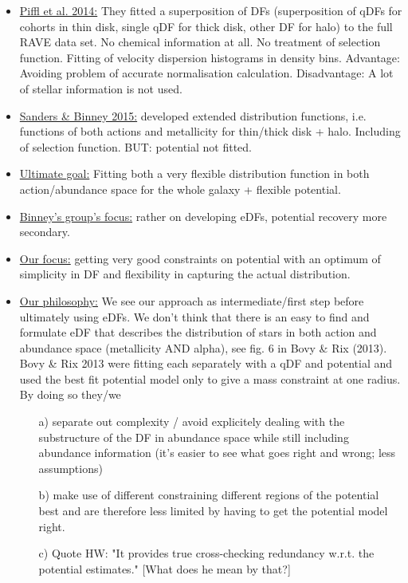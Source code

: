 \begin{itemize}
\begin{itemize}
\item \underline{Piffl et al. 2014:} They fitted a superposition of DFs (superposition of qDFs for cohorts in thin disk, single qDF for thick disk, other DF for halo) to the full RAVE data set. No chemical information at all. No treatment of selection function. Fitting of velocity dispersion histograms in density bins. Advantage: Avoiding problem of accurate normalisation calculation. Disadvantage: A lot of stellar information is not used.
\item  \underline{Sanders \& Binney 2015:} developed extended distribution functions, i.e. functions of both actions and metallicity for thin/thick disk + halo. Including of selection function. BUT: potential not fitted.
\item \underline{Ultimate goal:} Fitting both a very flexible distribution function in both action/abundance space for the whole galaxy + flexible potential.
\item \underline{Binney's group's focus:} rather on developing eDFs, potential recovery more secondary.
\item \underline{Our focus:} getting very good constraints on potential with an optimum of simplicity in DF and flexibility in capturing the actual distribution. 
\item \underline{Our philosophy:} We see our approach as intermediate/first step before ultimately using eDFs. We don't think that there is an easy to find and formulate eDF that describes the distribution of stars in both action and abundance space (metallicity AND alpha), see fig. 6 in Bovy \& Rix (2013). Bovy \& Rix 2013 were fitting each \MAP separately with a qDF and potential and used the best fit potential model only to give a mass constraint at one radius. By doing so they/we 
\begin{itemize}
\item[a)] separate out complexity / avoid explicitely dealing with the substructure of the DF in abundance space while still including abundance information (it's easier to see what goes right and wrong; less assumptions) 
\item[b)] make use of different \MAPs constraining different regions of the potential best and are therefore less limited by having to get the potential model right.
\item[c)] Quote HW: "It provides true cross-checking redundancy w.r.t. the potential estimates." [What does he mean by that?]
\end{itemize}
\end{itemize}


\end{itemize}
